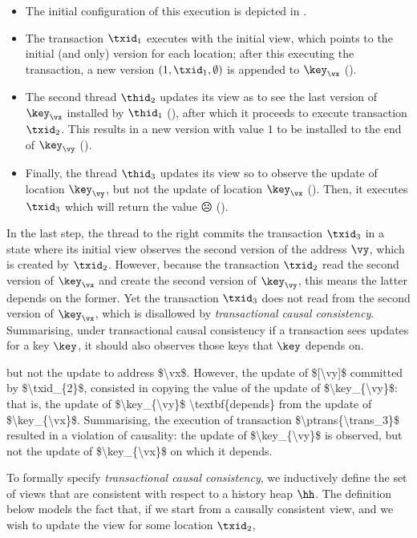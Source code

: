 \begin{itemize}
\item The initial configuration of this execution is depicted in .
\item The transaction $\txid_{1}$ executes with the initial view, which points to the initial (and only) version for each location; after this executing the transaction, a new version $( 1, \txid_1, \emptyset )$ is appended to \( \key_\vx\) ().
\item The second thread $\thid_2$ updates its view as to see the last version of $\key_\vx$ installed by $\thid_1$ (), after which it proceeds to execute transaction $\txid_{2}$. 
This results in a new version with value $1$ to be installed to the end of $\key_\vy$ (). 
\item Finally, the thread $\thid_3$ updates its view so to observe the update of location $\key_{\vy}$, but not the update of 
location $\key_{\vx}$ ().
Then, it executes $\txid_{3}$ which will return the value ${\sadface{}}$ ().
\end{itemize}

In the last step, the thread to the right commits the transaction $\txid_3$ in a state where its initial view observes the second version of the address $\vy$, which is created by \( \txid_{2} \).
However, because the transaction \( \txid_{2} \) read the second version of \( \key_\vx \) and create the second version of \( \key_\vy \), this means the latter depends on the former.
Yet the transaction \( \txid_{3} \) does not read from the second version of \( \key_\vx \), which is disallowed by \emph{transactional causal consistency}.
Summarising, under transactional causal consistency if a transaction sees updates for a key \( \key \), it should also observes those keys that \( \key \) depends on.

\ac{
but not the update to address $\vx$.
However, the update of $[\vy]$ committed by $\txid_{2}$, consisted in copying the value of the update 
of $\key_{\vy}$: that is, the update of $\key_{\vy}$ \textbf{depends} from the update of $\key_{\vx}$. 
Summarising, the execution of transaction $\ptrans{\trans_3}$ resulted in a violation of 
causality: the update of $\key_{\vy}$ is observed, but not the update of $\key_{\vx}$ on which 
it depends.
}

To formally specify \emph{transactional causal consistency}, we inductively define the set of views that are consistent with respect to a history heap $\hh$. 
The definition below models the fact that, if we start from a causally consistent view, and we wish to update the view for some location $\txid_2$, 


